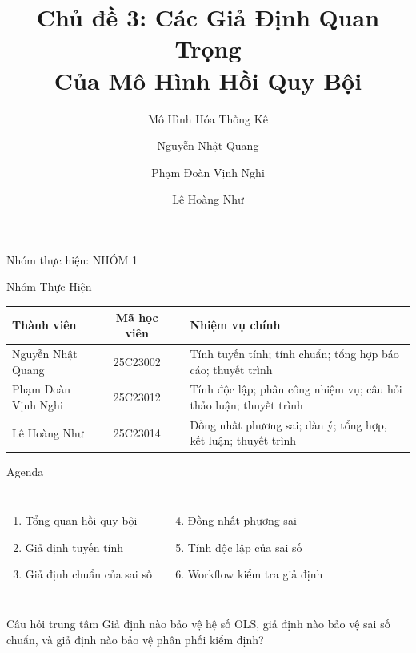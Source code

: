 \documentclass[aspectratio=169,professionalfonts]{beamer}
\title[Các giả định hồi quy bội]{Chủ đề 3: Các Giả Định Quan Trọng\\Của Mô Hình Hồi Quy Bội}
\subtitle{Mô Hình Hóa Thống Kê}
\author[NHÓM 1]{Nguyễn Nhật Quang \and Phạm Đoàn Vịnh Nghi \and Lê Hoàng Như}
\institute[HCMUS]{Trường Đại học Khoa học Tự Nhiên - ĐHQGHCM\\Giảng viên: TS. Nguyễn Thị Mộng Ngọc}
\date{}
\newcommand{\assumption}[2]{%
  \begin{block}{#1}
    #2
  \end{block}
}
\begin{document}
\begin{frame}
  \titlepage
  \vspace{-0.2cm}
  \begin{center}
    {\small Nhóm thực hiện: NHÓM 1}
  \end{center}
\end{frame}

\begin{frame}{Nhóm Thực Hiện}
  \small
  \begin{tabularx}{\textwidth}{@{}lclX@{}}
    \toprule
    \textbf{Thành viên} & \textbf{Mã học viên} & & \textbf{Nhiệm vụ chính} \\
    \midrule
    Nguyễn Nhật Quang & 25C23002 && Tính tuyến tính; tính chuẩn; tổng hợp báo cáo; thuyết trình \\
    Phạm Đoàn Vịnh Nghi & 25C23012 && Tính độc lập; phân công nhiệm vụ; câu hỏi thảo luận; thuyết trình \\
    Lê Hoàng Như & 25C23014 && Đồng nhất phương sai; dàn ý; tổng hợp, kết luận; thuyết trình \\
    \bottomrule
  \end{tabularx}
\end{frame}

\begin{frame}{Agenda}
  \begin{columns}[T,onlytextwidth]
      \begin{enumerate}
        \item Tổng quan hồi quy bội
        \item Giả định tuyến tính
        \item Giả định chuẩn của sai số
      \end{enumerate}
      \begin{enumerate}
        \setcounter{enumi}{3}
        \item Đồng nhất phương sai
        \item Tính độc lập của sai số
        \item Workflow kiểm tra giả định
      \end{enumerate}
  \end{columns}
  \vspace{0.45cm}
  \assumption{Câu hỏi trung tâm}{Giả định nào bảo vệ hệ số OLS, giả định nào bảo vệ sai số chuẩn, và giả định nào bảo vệ phân phối kiểm định?}
\end{frame}
\end{document}
